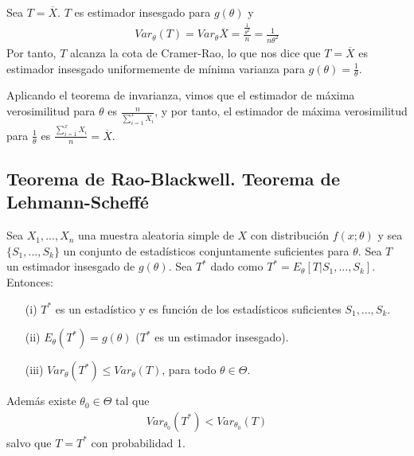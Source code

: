 \begin{ejemplo}
    Sea $T = \overline{X}$. $T$ es estimador insesgado para $g(\theta)$ y
    \begin{align*}
        Var_{\theta}(T) = Var_{\theta}{\overline{X}} = \frac{\frac{1}{\theta^2}}{n} = \frac{1}{n \theta^2}
    \end{align*}
    Por tanto, $T$ alcanza la cota de Cramer-Rao, lo que nos dice que $T = \overline{X}$ es estimador insesgado uniformemente de mínima varianza para $g(\theta) = \frac{1}{\theta}$.

    Aplicando el teorema de invarianza, vimos que el estimador de máxima verosimilitud para $\theta$ es $\frac{n}{\sum_{i=1}^{x}{X_i}}$, y por tanto, el estimador de máxima verosimilitud para $\frac{1}{\theta}$ es $\frac{\sum_{i=1}^{x}{X_i}}{n} = \overline{X}$.
\end{ejemplo}

\subsection{Teorema de Rao-Blackwell. Teorema de Lehmann-Scheffé}

\begin{teo}
    Sea $X_1,...,X_n$ una muestra aleatoria simple de $X$ con distribución $f(x;\theta)$ y sea $\{S_1,...,S_k\}$ un conjunto de estadísticos conjuntamente suficientes para $\theta$. Sea $T$ un estimador insesgado de $g(\theta)$. Sea $T^*$ dado como $T^* = E_{\theta}[T | S_1,...,S_k]$. Entonces:
    \begin{enumerate}
        \item[(i)] $T^*$ es un estadístico y es función de los estadísticos suficientes $S_1,...,S_k$.
        \item[(ii)] $E_{\theta}(T^*) = g(\theta)$ ($T^*$ es un estimador insesgado).
        \item[(iii)] $Var_{\theta}(T^*) \leq Var_{\theta}(T)$, para todo $\theta \in \Theta$.
    \end{enumerate}
    Además existe $\theta_0 \in \Theta$ tal que
    \begin{align*}
        Var_{\theta_0}(T^*) < Var_{\theta_0}(T)
    \end{align*}
    salvo que $T = T^*$ con probabilidad 1.
\end{teo}

